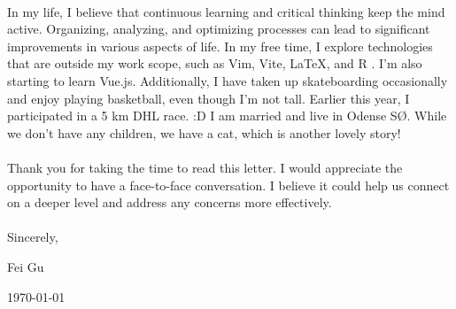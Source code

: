 \paragraph{}
In my life, I believe that continuous learning and critical thinking keep the mind active. Organizing, analyzing, and optimizing processes can lead to significant improvements in various aspects of life. In my free time, I explore technologies that are outside my work scope, such as Vim, Vite, LaTeX, and R . I'm also starting to learn Vue.js. Additionally, I have taken up skateboarding occasionally and enjoy playing basketball, even though I'm not tall. Earlier this year, I participated in a 5 km DHL race. :D I am married and live in Odense SØ. While we don't have any children, we have a cat, which is another lovely story!

\paragraph{}
Thank you for taking the time to read this letter. I would appreciate the opportunity to have a face-to-face conversation. I believe it could help us connect on a deeper level and address any concerns more effectively.

\paragraph{}
{\hfill Sincerely,} \par
{\hfill Fei Gu} \par
{\hfill \today} \par
